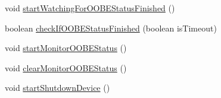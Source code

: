 \begin{DoxyCompactItemize}
\item 
void \hyperlink{classcom_1_1android_1_1server_1_1power_1_1PowerManagerService_aab98754f2ccc27266bac3bd02284719a}{start\-Watching\-For\-O\-O\-B\-E\-Status\-Finished} ()
\item 
boolean \hyperlink{classcom_1_1android_1_1server_1_1power_1_1PowerManagerService_a01870610adf1bddff8377ead48478964}{check\-If\-O\-O\-B\-E\-Status\-Finished} (boolean is\-Timeout)
\item 
void \hyperlink{classcom_1_1android_1_1server_1_1power_1_1PowerManagerService_ab3037ad6c1df518c1a2a7ab1ab0caee8}{start\-Monitor\-O\-O\-B\-E\-Status} ()
\item 
void \hyperlink{classcom_1_1android_1_1server_1_1power_1_1PowerManagerService_a864904faf25924bfc3b6c5b268836741}{clear\-Monitor\-O\-O\-B\-E\-Status} ()
\item 
void \hyperlink{classcom_1_1android_1_1server_1_1power_1_1PowerManagerService_ad60b77735d29f83416b9a545ace38487}{start\-Shutdown\-Device} ()
\end{DoxyCompactItemize}
